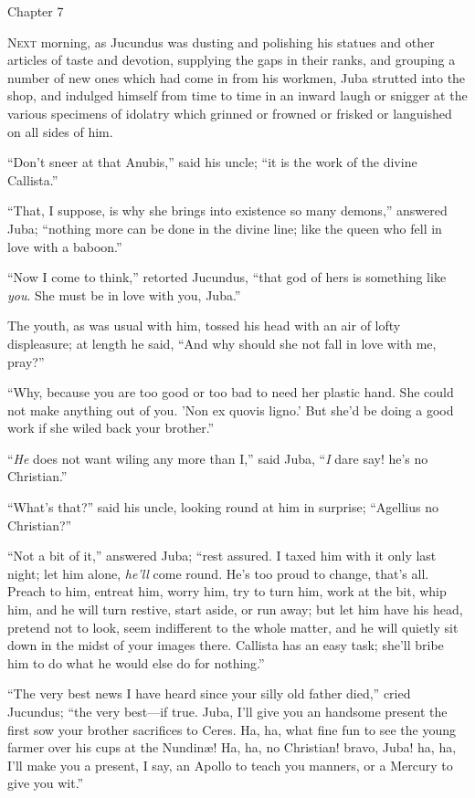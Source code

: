 Chapter 7


N\textsc{ext} morning, as Jucundus was dusting and polishing his
statues and other articles of taste and devotion, supplying the gaps
in their ranks, and grouping a number of new ones which had come in
from his workmen, Juba strutted into the shop, and indulged himself
from time to time in an inward laugh or snigger at the various
specimens of idolatry which grinned or frowned or frisked or
languished on all sides of him.

``Don't sneer at that Anubis,'' said his uncle; ``it is
the work of the divine Callista.''

``That, I suppose, is why she brings into existence so many
demons,'' answered Juba; ``nothing more can be done in the
divine line; like the queen who fell in love with a baboon.''

``Now I come to think,'' retorted Jucundus, ``that god
of hers is something like \emph{you}. She must be in love with you,
Juba.''

The youth, as was usual with him, tossed his head with an air of
lofty displeasure; at length he said, ``And why should she not
fall in love with me, pray?''

``Why, because you are too good or too bad to need her plastic
hand. She could not make anything out of you. 'Non ex quovis ligno.'
But she'd be doing a good work if she wiled back your brother.''

``\emph{He} does not want wiling any more than I,'' said
Juba, ``\emph{I} dare say! he's no Christian.''

``What's that?'' said his uncle, looking round at him in
surprise; ``Agellius no Christian?''

``Not a bit of it,'' answered Juba; ``rest assured. I
taxed him with it only last night; let him alone, \emph{he'll} come
round. He's too proud to change, that's all. Preach to him, entreat
him, worry him, try to turn him, work at the bit, whip him, and he
will turn restive, start aside, or run away; but let him have his
head, pretend not to look, seem indifferent to the whole matter, and
he will quietly sit down in the midst of your images there. Callista
has an easy task; she'll bribe him to do what he would else do for
nothing.''

``The very best news I have heard since your silly old father
died,'' cried Jucundus; ``the very best—if true. Juba, I'll
give you an handsome present the first sow your brother sacrifices to
Ceres. Ha, ha, what fine fun to see the young farmer over his cups at
the Nundinæ! Ha, ha, no Christian! bravo, Juba! ha, ha, I'll make you
a present, I say, an Apollo to teach you manners, or a Mercury to give
you wit.''

